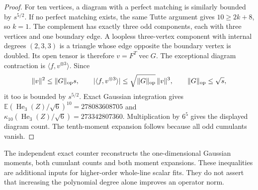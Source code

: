 \documentclass[11pt]{article}
\begin{document}
\begin{proof}
For ten vertices, a diagram with a perfect matching is similarly bounded
by $s^{5/2}$. If no perfect matching exists, the same Tutte argument gives
$10\ge2k+8$, so $k=1$. The complement has exactly three odd components,
each with three vertices and one boundary edge. A loopless three-vertex
component with internal degrees $(2,3,3)$ is a triangle whose edge opposite
the boundary vertex is doubled. Its open tensor is therefore
$v=F^T\operatorname{vec}G$. The exceptional diagram contraction is
$\langle f,v^{\otimes3}\rangle$. Since
\begin{equation*}
 \|v\|^2\le\|G\|_{\rm op}s,\qquad
 |\langle f,v^{\otimes3}\rangle|
 \le\sqrt{\|G\|_{\rm op}}\,\|v\|^3,
 \qquad\|G\|_{\rm op}\le\sqrt s,
\end{equation*}
it too is bounded by $s^{5/2}$.
Exact Gaussian integration gives
$\mathbb E(\operatorname{He}_3(Z)/\sqrt6)^{10}=278083608705$ and
$\kappa_{10}(\operatorname{He}_3(Z)/\sqrt6)=273342807360$.
Multiplication by $6^5$ gives the displayed diagram count.
The tenth-moment expansion follows because all odd cumulants vanish.
\end{proof}

The independent exact counter reconstructs the one-dimensional Gaussian moments, both cumulant counts and both moment expansions. These inequalities are additional inputs for higher-order whole-line scalar fits. They do not assert that increasing the polynomial degree alone improves an operator norm.
\end{document}
